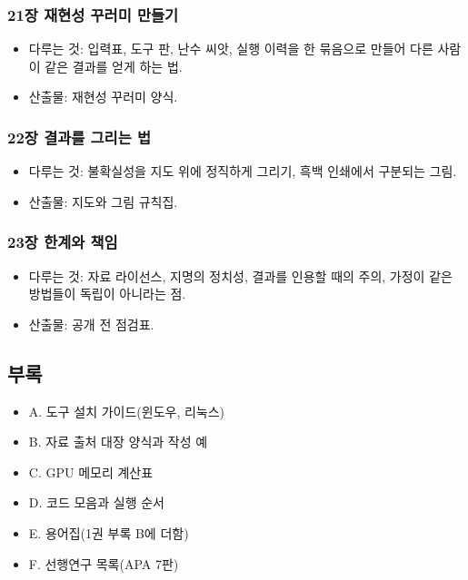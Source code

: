 \hypertarget{uxc7a5-uxc7acuxd604uxc131-uxafb8uxb7ecuxbbf8-uxb9ccuxb4e4uxae30}{%
\subsubsection{21장 재현성 꾸러미 만들기}\label{uxc7a5-uxc7acuxd604uxc131-uxafb8uxb7ecuxbbf8-uxb9ccuxb4e4uxae30}}

\begin{itemize}
\tightlist
\item
  다루는 것: 입력표, 도구 판, 난수 씨앗, 실행 이력을 한 묶음으로 만들어 다른 사람이 같은 결과를 얻게 하는 법.
\item
  산출물: 재현성 꾸러미 양식.
\end{itemize}

\hypertarget{uxc7a5-uxacb0uxacfcuxb97c-uxadf8uxb9acuxb294-uxbc95}{%
\subsubsection{22장 결과를 그리는 법}\label{uxc7a5-uxacb0uxacfcuxb97c-uxadf8uxb9acuxb294-uxbc95}}

\begin{itemize}
\tightlist
\item
  다루는 것: 불확실성을 지도 위에 정직하게 그리기, 흑백 인쇄에서 구분되는 그림.
\item
  산출물: 지도와 그림 규칙집.
\end{itemize}

\hypertarget{uxc7a5-uxd55cuxacc4uxc640-uxcc45uxc784}{%
\subsubsection{23장 한계와 책임}\label{uxc7a5-uxd55cuxacc4uxc640-uxcc45uxc784}}

\begin{itemize}
\tightlist
\item
  다루는 것: 자료 라이선스, 지명의 정치성, 결과를 인용할 때의 주의, 가정이 같은 방법들이 독립이 아니라는 점.
\item
  산출물: 공개 전 점검표.
\end{itemize}

\hypertarget{uxbd80uxb85d}{%
\subsection{부록}\label{uxbd80uxb85d}}

\begin{itemize}
\tightlist
\item
  A. 도구 설치 가이드(윈도우, 리눅스)
\item
  B. 자료 출처 대장 양식과 작성 예
\item
  C. GPU 메모리 계산표
\item
  D. 코드 모음과 실행 순서
\item
  E. 용어집(1권 부록 B에 더함)
\item
  F. 선행연구 목록(APA 7판)
\end{itemize}


